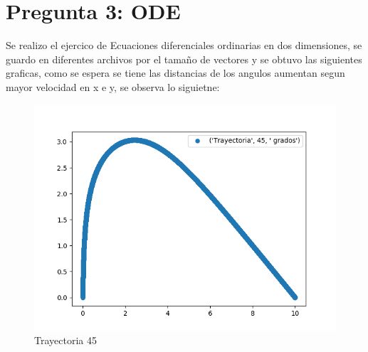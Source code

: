 \documentclass{article}
\begin{document}
\section{Pregunta 3: ODE}
Se realizo el ejercico de Ecuaciones diferenciales ordinarias en dos dimensiones, se guardo en diferentes archivos por el tamaño de vectores y se obtuvo las siguientes graficas, como se espera se tiene las distancias de los angulos aumentan segun mayor velocidad en x e y, se observa lo siguietne:
\begin{figure}
  \centering
    \includegraphics{('Trayectoria', 45, ' grados').png}
  \caption{Trayectoria 45}
  \label{fig:ejemplo1}
\end{figure}
\end{document}
